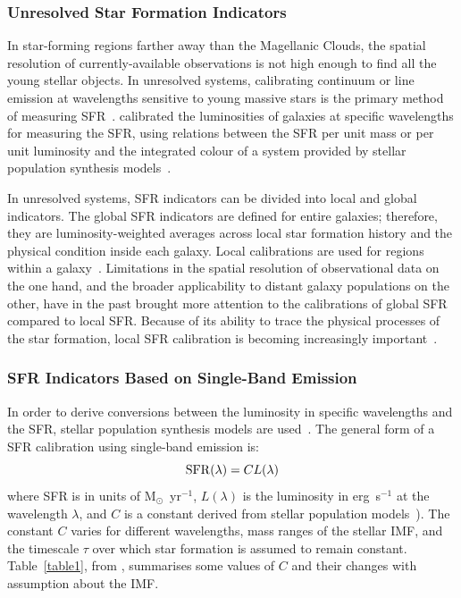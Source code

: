 \subsubsection{Unresolved Star Formation Indicators}

 In star-forming regions farther away than the Magellanic Clouds, the spatial resolution of currently-available observations is not high enough to find all the young stellar objects. 
 In unresolved systems, calibrating continuum or line emission at wavelengths sensitive to young massive stars is the primary method of measuring SFR~\citep[e.g.,][]{Kennicutt98b, Kewley02, Bell03, Calzetti07, Calzetti08, Calzetti10, Calzetti13, Kennicutt07, Kennicutt09, Boquien10, Hao11, Kennicutt12}. 
\cite{Kennicutt98b} calibrated the luminosities of galaxies at specific wavelengths for measuring the SFR, using relations between the SFR per unit mass or per unit luminosity and the integrated colour of a system provided by stellar population synthesis models~\citep[e.g.,][]{Bruzual93}. 

In unresolved systems, SFR indicators can be divided into local and global indicators. 
The global SFR indicators are defined for entire galaxies; therefore, they are luminosity-weighted averages across local star formation history and the physical condition inside each galaxy. 
Local calibrations are used for regions within a galaxy~\citep[e.g.,][]{Zhu08, Kennicutt09, Boquien10, Boquien11, Hao11}.
Limitations in the spatial resolution of observational data on the one hand, and the broader applicability to distant galaxy populations on the other, have in the past brought more attention to the calibrations of global SFR compared to local SFR. 
Because of its ability to trace the physical processes of the star formation, local SFR calibration is becoming increasingly important~\citep{Calzetti13}.

\subsubsection*{SFR Indicators Based on Single-Band Emission}

In order to derive conversions between the luminosity in specific wavelengths and the SFR, stellar population synthesis models are used~\citep{Kennicutt98b}. 
The general form of a SFR calibration using single-band emission is: 
\begin{equation}
\label{equ: sfrsingle}
{\rm SFR}(\lambda)= CL(\lambda)
\end{equation}
where SFR is in units of M${_\odot}$~yr$^{-1}$, $L(\lambda)$ is the luminosity in erg~s$^{-1}$ at the wavelength $\lambda$, and $C$ is a constant derived from stellar population models~\citep[e.g, starburst99][]{Leitherer99}). 
The constant $C$ varies for different wavelengths, mass ranges of the stellar IMF, and the timescale $\tau$ over which star formation is assumed to remain constant. 
Table~\ref{table1}, from \cite{Calzetti13}, summarises some values of $C$ and their changes with assumption about the IMF. 

